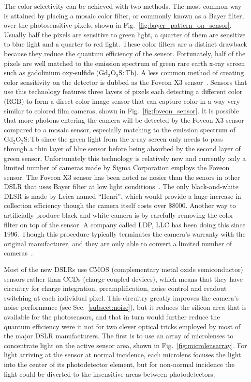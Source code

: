 The color selectivity can be achieved with two methods.  The most common way is attained by placing a mosaic color filter, or commonly known as a Bayer filter, over the photosensitive pixels, shown in Fig.~\ref{fig:bayer_pattern_on_sensor}.  Usually half the pixels are sensitive to green light, a quarter of them are sensitive to blue light and a quarter to red light.  These color filters are a distinct drawback because they reduce the quantum efficiency of the sensor.  Fortunately, half of the pixels are well matched to the emission spectrum of green rare earth x-ray screen such as gadolinium oxy-sulfide ($\mathrm{Gd_2O_2S:Tb}$).  A less common method of creating color sensitivity on the detector is dubbed as the Foveon X3 sensor~\citep{foveon}.  Sensors that use this technology features three layers of pixels each detecting a different color (RGB) to form a direct color image sensor that can capture color in a way very similar to colored film cameras, shown in Fig.~\ref{fig:foveon_sensor}.  It is possible that more photons entering the camera will be detected by the Foveon X3 sensor compared to a mosaic sensor, especially matching to the emission spectrum of $\mathrm{Gd_2O_2S:Tb}$ since the green light from the x-ray screen only needs to pass through a thin layer of blue sensor before being absorbed by the second layer of green sensor.  Unfortunately this technology is relatively new and currently only a limited number of cameras made by Sigma Corporation employs the Foveon sensor.  The Foveon X3 sensor has been noted as nosier than the senors in other DSLR that uses Bayer filter at low light conditions~\citep{sigmasd10, stevesdigicams}.  The only black-and-white DLSR is made by Leica named ``Henri'', which would provide a huge increase in collection efficiency though the camera itself costs over \$8000.  Another way to artificially produce black and white camera is by carefully removing the color filter on top of the sensor.  A company called LDP, LLC has been doing this since 1996.  Though this procedure typically terminates the camera's warranty with the original manufacturer, and they are only able to convert a limited number of cameras~\citep{maxmax}.

Most of the new DSLRs use CMOS (complementary metal oxide semiconductor) sensors rather than CCDs (charge-coupled devices), which means that they have circuitry for charge integration, preamplification, noise control and readout switching at each individual pixel. This circuitry greatly improves the camera's noise performance (see Sec.~\ref{subsect:noise}), but it reduces the silicon area that is available for the photosensors, and that in turn would further reduce the quantum efficiency were it not for two clever optical tricks employed by most of the major DSLR manufacturers. The first is to use an array of microlenses to concentrate light on the active sensor area, shown in Fig.~\ref{fig:microlensarray}. For light arriving at the sensor at normal incidence, each microlens focuses the light into the center of its photodetector element, but for non-normal incidence the light could be diverted to the insensitive areas between photodetectors.

